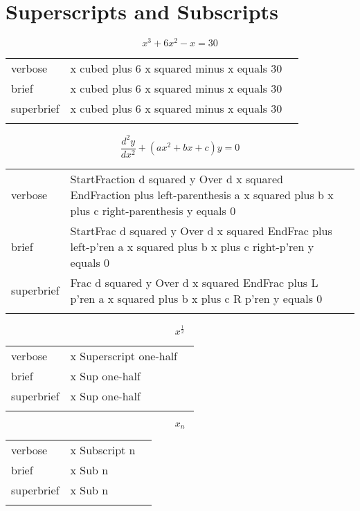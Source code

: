 
\section{Superscripts and Subscripts}
\label{sec:super}

\R
\E \[x^3+6x^2-x=30\]
\begin{longtable}[c]{@{}lll@{}}
\toprule\addlinespace
verbose & x cubed plus 6 x squared minus x equals 30 &

\\\addlinespace
brief & x cubed plus 6 x squared minus x equals 30 &

\\\addlinespace
superbrief & x cubed plus 6 x squared minus x equals 30 &

\\\addlinespace
\bottomrule
\end{longtable}


\E \[\frac{d^2y}{dx^2} + \left(ax^2+bx+c\right) y = 0\]
\begin{longtable}[c]{@{}lll@{}}
\toprule\addlinespace
verbose & StartFraction d squared y Over d x squared EndFraction plus
left-parenthesis a x squared plus b x plus c right-parenthesis y equals
0 &

\\\addlinespace
brief & StartFrac d squared y Over d x squared EndFrac plus left-p'ren a
x squared plus b x plus c right-p'ren y equals 0 &

\\\addlinespace
superbrief & Frac d squared y Over d x squared EndFrac plus L p'ren a x
squared plus b x plus c R p'ren y equals 0 &

\\\addlinespace
\bottomrule
\end{longtable}


\R
\E \[x^{\frac{1}{2}}\]
\begin{longtable}[c]{@{}lll@{}}
\toprule\addlinespace
verbose & x Superscript one-half &

\\\addlinespace
brief & x Sup one-half &

\\\addlinespace
superbrief & x Sup one-half &

\\\addlinespace
\bottomrule
\end{longtable}


\E \[x_n\]
\begin{longtable}[c]{@{}lll@{}}
\toprule\addlinespace
verbose & x Subscript n &

\\\addlinespace
brief & x Sub n &

\\\addlinespace
superbrief & x Sub n &

\\\addlinespace
\bottomrule
\end{longtable}


